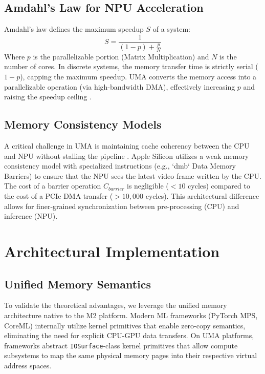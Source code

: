 \documentclass[conference]{IEEEtran}
\begin{document}
\subsection{Amdahl's Law for NPU Acceleration}
Amdahl's law defines the maximum speedup $S$ of a system:
\begin{equation}
S = \frac{1}{(1-p) + \frac{p}{N}}
\end{equation}
Where $p$ is the parallelizable portion (Matrix Multiplication) and $N$ is the number of cores. In discrete systems, the memory transfer time is strictly serial ($1-p$), capping the maximum speedup. UMA converts the memory access into a parallelizable operation (via high-bandwidth DMA), effectively increasing $p$ and raising the speedup ceiling \cite{b17, b18}.

\subsection{Memory Consistency Models}
A critical challenge in UMA is maintaining cache coherency between the CPU and NPU without stalling the pipeline \cite{b19}. Apple Silicon utilizes a weak memory consistency model with specialized instructions (e.g., `dmb` Data Memory Barriers) to ensure that the NPU sees the latest video frame written by the CPU.
The cost of a barrier operation $C_{barrier}$ is negligible ($<10$ cycles) compared to the cost of a PCIe DMA transfer ($>10,000$ cycles). This architectural difference allows for finer-grained synchronization between pre-processing (CPU) and inference (NPU).

\section{Architectural Implementation}

\subsection{Unified Memory Semantics}

To validate the theoretical advantages, we leverage the unified memory architecture native to the M2 platform. Modern ML frameworks (PyTorch MPS, CoreML) internally utilize kernel primitives that enable zero-copy semantics, eliminating the need for explicit CPU-GPU data transfers. On UMA platforms, frameworks abstract \texttt{IOSurface}-class kernel primitives that allow compute subsystems to map the same physical memory pages into their respective virtual address spaces.
\end{document}
